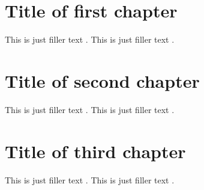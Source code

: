 \documentclass[a4paper,oneside]{book}
\begin{document}
\chapter{Title of first chapter}
\begin{refsection}
This is just filler text \parencite{westfahl:space}.
This is just filler text \parencite{nietzsche:ksa}.
\end{refsection}

\chapter{Title of second chapter}
\begin{refsection}
This is just filler text \parencite{nietzsche:historie}.
This is just filler text \parencite{westfahl:frontier}.
\end{refsection}

\chapter{Title of third chapter}
\begin{refsection}
This is just filler text \parencite{aristotle:anima}.
This is just filler text \parencite{averroes/bland}.
\end{refsection}

\printbibheading
\bibbysection[heading=subbibliography]
%
%
\end{document}
